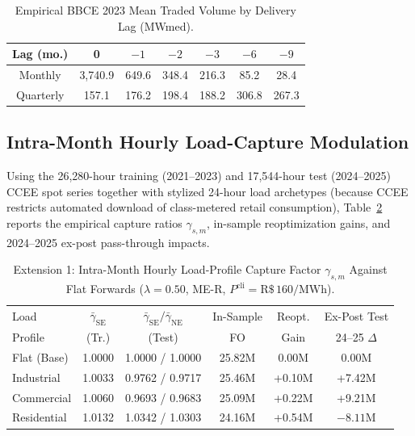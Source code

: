 \documentclass[10pt,journal]{IEEEtran}
\begin{document}
\begin{table}[htbp]
\centering
\caption{Empirical BBCE 2023 Mean Traded Volume by Delivery Lag (MWmed).}
\label{tab:supp_bbce}
\scriptsize
\setlength{\tabcolsep}{3.0pt}
\begin{tabular}{ccccccc}
\toprule
Lag (mo.) & 0 & $-1$ & $-2$ & $-3$ & $-6$ & $-9$ \\
\midrule
Monthly   & 3,740.9 & 649.6 & 348.4 & 216.3 & 85.2  & 28.4 \\
Quarterly & 157.1   & 176.2 & 198.4 & 188.2 & 306.8 & 267.3 \\
\bottomrule
\end{tabular}
\end{table}

\subsection{Intra-Month Hourly Load-Capture Modulation}
Using the 26,280-hour training (2021--2023) and 17,544-hour test (2024--2025) CCEE spot series together with stylized 24-hour load archetypes (because CCEE restricts automated download of class-metered retail consumption), Table~\ref{tab:supp_mod} reports the empirical capture ratios $\gamma_{s,m}$, in-sample reoptimization gains, and 2024--2025 ex-post pass-through impacts.

\begin{table}[htbp]
\centering
\caption{Extension 1: Intra-Month Hourly Load-Profile Capture Factor $\gamma_{s,m}$ Against Flat Forwards ($\lambda = 0.50$, ME-R, $P^{\text{cli}} = \text{R\$}\,160/\text{MWh}$).}
\label{tab:supp_mod}
\scriptsize
\setlength{\tabcolsep}{1.6pt}
\begin{tabular}{lccccc}
\toprule
Load & $\bar{\gamma}_{\text{SE}}$ & $\bar{\gamma}_{\text{SE}} / \bar{\gamma}_{\text{NE}}$ & In-Sample & Reopt. & Ex-Post Test \\
Profile & (Tr.) & (Test) & FO & Gain & 24--25 $\Delta$ \\
\midrule
Flat (Base)  & 1.0000 & 1.0000 / 1.0000 & 25.82M & 0.00M & 0.00M \\
Industrial   & 1.0033 & 0.9762 / 0.9717 & 25.46M & +0.10M & +7.42M \\
Commercial   & 1.0060 & 0.9693 / 0.9683 & 25.09M & +0.22M & +9.21M \\
Residential  & 1.0132 & 1.0342 / 1.0303 & 24.16M & +0.54M & $-8.11\text{M}$ \\
\bottomrule
\end{tabular}
\end{table}
\end{document}
